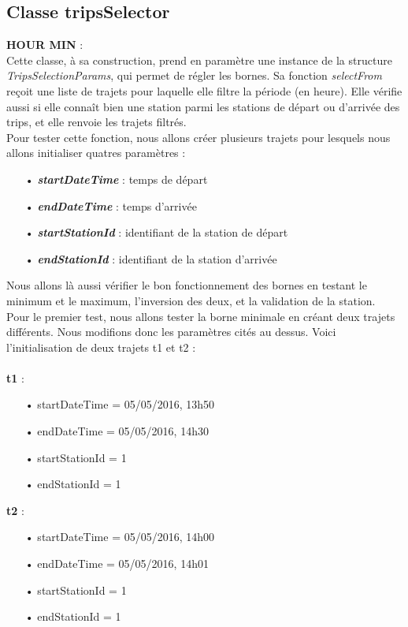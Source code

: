 \documentclass[12pt]{article}
\begin{document}
	\subsection{Classe tripsSelector}
	\textbf{HOUR MIN} :\\
	Cette classe, à sa construction, prend en paramètre une instance de la structure \textit{TripsSelectionParams}, qui permet de régler les bornes. Sa fonction \textit{selectFrom} reçoit une liste de trajets pour laquelle elle filtre la période (en heure). Elle vérifie aussi si elle connaît bien une station parmi les stations de départ ou d’arrivée des trips, et elle renvoie les trajets filtrés.\\
Pour tester cette fonction, nous allons créer plusieurs trajets pour lesquels nous allons initialiser quatres paramètres :\\
	\begin{itemize}
	\item[•] \textbf{\textit{startDateTime}} : temps de départ
	\item[•] \textbf{\textit{endDateTime}} :  temps d’arrivée 
	\item[•] \textbf{\textit{startStationId}} : identifiant de la station de départ
	\item[•] \textbf{\textit{endStationId}} : identifiant de la station d’arrivée\\
	\end{itemize}
	
	Nous allons là aussi vérifier le bon fonctionnement des bornes en testant le minimum et le maximum, l’inversion des deux, et la validation de la station.\\

Pour le premier test, nous allons tester la borne minimale en créant deux trajets différents. Nous modifions donc les paramètres cités au dessus. Voici l’initialisation de deux trajets t1 et t2 :\\ \\

	\textbf{t1} :
	\begin{itemize}
	\item[•] startDateTime = 05/05/2016, 13h50
	\item[•] endDateTime = 05/05/2016, 14h30
	\item[•] startStationId = 1
	\item[•] endStationId = 1\\
	\end{itemize}

	\textbf{t2} :
	\begin{itemize}
	\item[•] startDateTime = 05/05/2016, 14h00
	\item[•] endDateTime = 05/05/2016, 14h01
	\item[•] startStationId = 1
	\item[•] endStationId = 1 \\
	\end{itemize}
	
\end{document}

